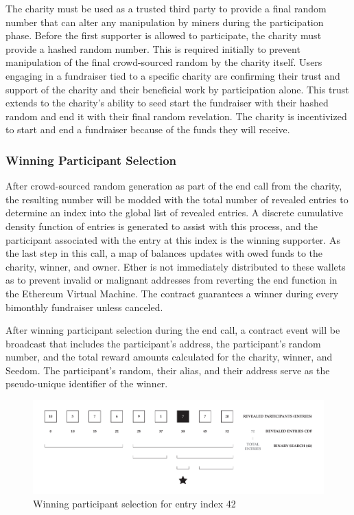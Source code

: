 \documentclass[11pt]{article}
\begin{document}
The charity must be used as a trusted third party to provide a final random number that can alter any manipulation by miners during the participation phase. Before the first supporter is allowed to participate, the charity must provide a hashed random number. This is required initially to prevent manipulation of the final crowd-sourced random by the charity itself. Users engaging in a fundraiser tied to a specific charity are confirming their trust and support of the charity and their beneficial work by participation alone. This trust extends to the charity's ability to seed start the fundraiser with their hashed random and end it with their final random revelation. The charity is incentivized to start and end a fundraiser because of the funds they will receive.

\subsubsection{Winning Participant Selection}

After crowd-sourced random generation as part of the end call from the charity, the resulting number will be modded with the total number of revealed entries to determine an index into the global list of revealed entries. A discrete cumulative density function of entries is generated to assist with this process, and the participant associated with the entry at this index is the winning supporter. As the last step in this call, a map of balances updates with owed funds to the charity, winner, and owner. Ether is not immediately distributed to these wallets as to prevent invalid or malignant addresses from reverting the end function in the Ethereum Virtual Machine. The contract guarantees a winner during every bimonthly fundraiser unless canceled.

After winning participant selection during the end call, a contract event will be broadcast that includes the participant's address, the participant's random number, and the total reward amounts calculated for the charity, winner, and Seedom. The participant's random, their alias, and their address serve as the pseudo-unique identifier of the winner.

\begin{figure}[H]
\begin{center}
\includegraphics[width=1.0\textwidth]{winningParticipantSelection.pdf}
\caption{Winning participant selection for entry index 42}
\label{figure:winningParticipantSelection}
\end{center}
\end{figure}
\end{document}
